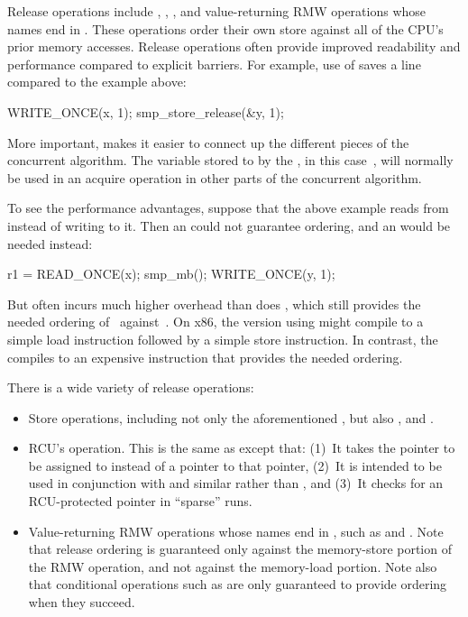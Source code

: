 Release operations include , ,
, and value-returning RMW operations whose names
end in .
These operations order their own store against all of the CPU's prior
memory accesses.
Release operations often provide improved readability and performance
compared to explicit barriers.
For example, use of  saves a line compared to the
 example above:

\begin{VerbatimU}
	WRITE_ONCE(x, 1);
	smp_store_release(&y, 1);
\end{VerbatimU}

More important,  makes it easier to connect up the
different pieces of the concurrent algorithm.
The variable stored to by the , in this case~,
will normally be used in an acquire operation in other parts of the
concurrent algorithm.

To see the performance advantages, suppose that the above example reads
from~ instead of writing to it.
Then an  could not guarantee ordering, and an 
would be needed instead:

\begin{VerbatimU}
	r1 = READ_ONCE(x);
	smp_mb();
	WRITE_ONCE(y, 1);
\end{VerbatimU}

But  often incurs much higher overhead than does
, which still provides the needed ordering of~
against~.
On x86, the version using  might compile
to a simple load instruction followed by a simple store instruction.
In contrast, the  compiles to an expensive instruction that
provides the needed ordering.

There is a wide variety of release operations:

\begin{itemize}
 \item	Store operations, including not only the aforementioned
	, but also , and
	.

 \item	RCU's  operation.  This is the same as
	 except that:
	(1)~It takes the pointer to be assigned to instead of a pointer
	to that pointer, (2)~It is intended to be used in conjunction with
	 and similar rather than ,
	and (3)~It checks for an RCU-protected pointer in ``sparse'' runs.

 \item	Value-returning RMW operations whose names end in ,
	such as  and .
	Note that release ordering is guaranteed only against the
	memory-store portion of the RMW operation, and not against the
	memory-load portion.
	Note also that conditional operations such as 
	are only guaranteed to provide ordering when they succeed.
\end{itemize}

